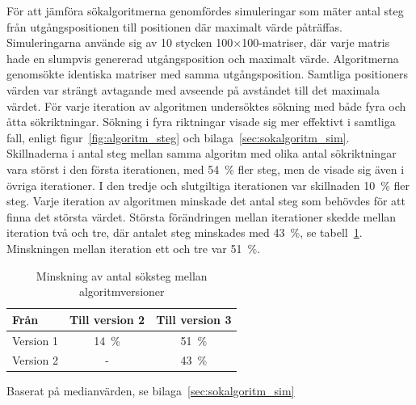             För att jämföra sökalgoritmerna genomfördes simuleringar som mäter antal steg från utgångspositionen till positionen där maximalt värde påträffas. Simuleringarna använde sig av 10 stycken 100$\times$100-matriser, där varje matris hade en slumpvis genererad utgångsposition och maximalt värde. Algoritmerna genomsökte identiska matriser med samma utgångsposition. Samtliga positioners värden var strängt avtagande med avseende på avståndet till det maximala värdet. För varje iteration av algoritmen undersöktes sökning med både fyra och åtta sökriktningar. Sökning i fyra riktningar visade sig mer effektivt i samtliga fall, enligt figur~\ref{fig:algoritm_steg} och bilaga~\ref{sec:sokalgoritm_sim}. Skillnaderna i antal steg mellan samma algoritm med olika antal sökriktningar vara störst i den första iterationen, med 54~\% fler steg, men de visade sig även i övriga iterationer. I den tredje och slutgiltiga iterationen var skillnaden 10~\% fler steg. Varje iteration av algoritmen minskade det antal steg som behövdes för att finna det största värdet. Största förändringen mellan iterationer skedde mellan iteration två och tre, där antalet steg minskades med 43~\%, se tabell~\ref{tab:algoritm_forbattring}. Minskningen mellan iteration ett och tre var 51~\%. \bigskip

            \begin{table}[b]
                \caption{\label{tab:algoritm_forbattring}Minskning av antal söksteg mellan algoritmversioner}
                \centering
                \begin{threeparttable}
                \begin{tabular}{@{}lcc@{}}
                \toprule
                Från        & \multicolumn{1}{l}{Till version 2} & \multicolumn{1}{l}{Till version 3} \\ \midrule
                Version 1 & 14~\%                                & 51~\%                                \\
                Version 2 & -                                    & 43~\% \\ \bottomrule
                \end{tabular}
                \begin{tablenotes}
                \item Baserat på medianvärden, se bilaga~\ref{sec:sokalgoritm_sim}
            \end{tablenotes}
            \end{threeparttable}
            \end{table}

